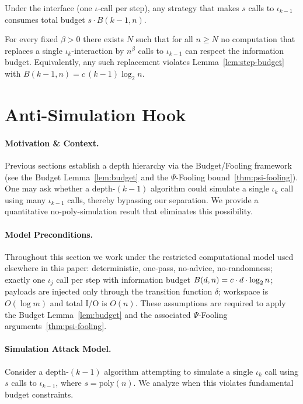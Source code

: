 
\begin{lemma}\label{lem:step-budget}
Under the interface (one $\iota$-call per step), any strategy that makes $s$ calls to $\iota_{k-1}$ consumes total budget $s\cdot B(k-1,n)$.
\end{lemma}

\begin{theorem}\label{thm:antisim}
For every fixed $\beta>0$ there exists $N$ such that for all $n\ge N$ no computation that replaces a single $\iota_{k}$-interaction by $n^{\beta}$ calls to $\iota_{k-1}$ can respect the information budget. Equivalently, any such replacement violates Lemma~\ref{lem:step-budget} with $B(k-1,n)=c\,(k-1)\log_{2}n$.
\end{theorem}
\section{Anti-Simulation Hook}
\label{AntiSim:sec:hook}

\paragraph{Motivation \& Context.}
Previous sections establish a depth hierarchy via the Budget/Fooling framework (see the Budget Lemma~\ref{lem:budget} and the $\Psi$-Fooling bound~\ref{thm:psi-fooling}). One may ask whether a depth-$(k{-}1)$ algorithm could simulate a single $\iota_k$ call using many $\iota_{k-1}$ calls, thereby bypassing our separation. We provide a quantitative no-poly-simulation result that eliminates this possibility.

\paragraph{Model Preconditions.}
Throughout this section we work under the restricted computational model used elsewhere in this paper:
deterministic, one-pass, no-advice, no-randomness; exactly one $\iota_j$ call per step with information budget $\B(d,n)=c \cdot d \cdot \log_{2} n$; payloads are injected only through the transition function $\delta$; workspace is $O(\log m)$ and total I/O is $O(n)$. These assumptions are required to apply the Budget Lemma~\ref{lem:budget} and the associated $\Psi$-Fooling arguments~\ref{thm:psi-fooling}.

\paragraph{Simulation Attack Model.}
Consider a depth-\((k{-}1)\) algorithm attempting to simulate a single $\iota_k$ call using $s$ calls to $\iota_{k-1}$, where $s = \text{poly}(n)$. We analyze when this violates fundamental budget constraints.

